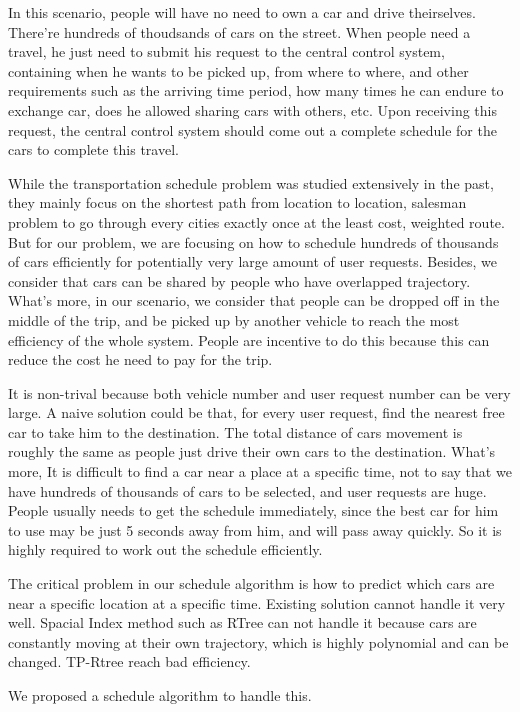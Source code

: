 \documentclass{vldb}
\begin{document}
In this scenario, people will have no need to own a car and drive theirselves.
There’re hundreds of thoudsands of cars on the street.
When people need a travel, he just need to submit his request to the central control system,
containing when he wants to be picked up, from where to where,
and other requirements such as the arriving time period,
how many times he can endure to exchange car, does he allowed sharing cars with others, etc.
Upon receiving this request,
the central control system should come out a complete schedule for the cars to complete this travel.

While the transportation schedule problem was studied extensively in the past,
they mainly focus on the shortest path from location to location,
salesman problem to go through every cities exactly once at the least cost, weighted route.
But for our problem,
we are focusing on how to schedule hundreds of thousands of cars efficiently for
potentially very large amount of user requests.
Besides, we consider that cars can be shared by people who have overlapped trajectory.
What’s more, in our scenario, we consider that people can be dropped off in the middle of the trip,
and be picked up by another vehicle to reach the most efficiency of the whole system.
People are incentive to do this because this can reduce the cost he need to pay for the trip.

It is non-trival because both vehicle number and user request number can be very large.
A naive solution could be that, for every user request, find the nearest free car to take him to the destination.
The total distance of cars movement is roughly the same as people just drive their own cars to the destination.
What’s more, It is difficult to find a car near a place at a specific time,
not to say that we have hundreds of thousands of cars to be selected,
and user requests are huge. People usually needs to get the schedule immediately,
since the best car for him to use may be just 5 seconds away from him, and will pass away quickly.
So it is highly required to work out the schedule efficiently.

The critical problem in our schedule algorithm is
how to predict which cars are near a specific location at a specific time.
Existing solution cannot handle it very well.
Spacial Index method such as RTree can not handle it because cars are constantly moving at their own trajectory,
which is highly polynomial and can be changed.
TP-Rtree reach bad efficiency.

We proposed a schedule algorithm to handle this.
\end{document}
